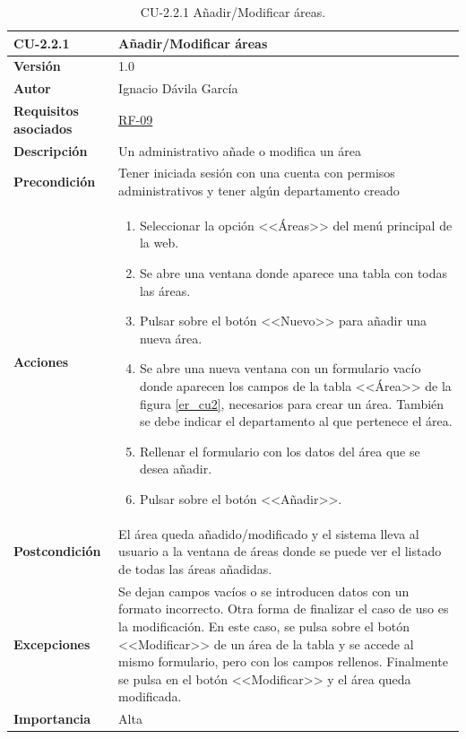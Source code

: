 \begin{table}[p]
\label{table:CU-2.2.1}
	\centering
	\begin{tabularx}{\linewidth}{ p{} p{} }
		\toprule
		\textbf{CU-2.2.1}    & \textbf{Añadir/Modificar áreas}\\
		\toprule
		\textbf{Versión}              & 1.0    \\
		\textbf{Autor}                & Ignacio Dávila García \\
		\textbf{Requisitos asociados} & \hyperref[itm:RF9]{RF-09} \\
		\textbf{Descripción}          & Un administrativo añade o modifica un área \\
		\textbf{Precondición}         & Tener iniciada sesión con una cuenta con permisos administrativos y tener algún departamento creado \\
		\textbf{Acciones}             &
		\begin{enumerate}
			\def\labelenumi{\arabic{enumi}.}
			\tightlist
			\item Seleccionar la opción <<Áreas>> del menú principal de la web.
			\item Se abre una ventana donde aparece una tabla con todas las áreas.
			\item Pulsar sobre el botón <<Nuevo>> para añadir una nueva área.
			\item Se abre una nueva ventana con un formulario vacío donde aparecen los campos de la tabla <<Área>> de la figura \ref{er_cu2}, necesarios para crear un área. También se debe indicar el departamento al que pertenece el área.
			\item Rellenar el formulario con los datos del área que se desea añadir.
			\item Pulsar sobre el botón <<Añadir>>.
		\end{enumerate}\\
		\textbf{Postcondición}        & El área queda añadido/modificado y el sistema lleva al usuario a la ventana de áreas donde se puede ver el listado de todas las áreas añadidas. \\
		\textbf{Excepciones}          & Se dejan campos vacíos o se introducen datos con un formato incorrecto. Otra forma de finalizar el caso de uso es la modificación. En este caso, se pulsa sobre el botón <<Modificar>> de un área de la tabla y se accede al mismo formulario, pero con los campos rellenos. Finalmente se pulsa en el botón <<Modificar>> y el área queda modificada. \\
		\textbf{Importancia}          & Alta \\
		\bottomrule
	\end{tabularx}
	\caption{CU-2.2.1 Añadir/Modificar áreas.}
\end{table}
\FloatBarrier

